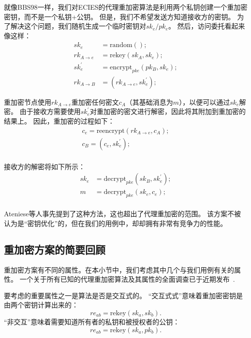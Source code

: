 \documentclass[longbibliography,nofootinbib]{revtex4-1}
\begin{document}
就像BBS98一样，我们对ECIES的代理重加密算法是利用两个私钥创建一个重加密密钥，而不是一个私钥+公钥。
但是，我们不希望发送方知道接收方的密钥。
为了解决这个问题，我们随机生成一个临时密钥对$sk_e/pk_e$。
然后，访问委托看起来像这样：
\begin{align}
    \label{eq:ephemeral-trick}
    sk_e &= \text{random}();\\
    rk_{A\rightarrow e} &= \text{rekey}(sk_A, sk_e);\\
    \label{eq:ephemeral-trick-end}
    sk_e^{\prime} &= \text{encrypt}_{pke}(pk_B, sk_e);\\
    rk_{A\rightarrow B} &= (rk_{A\rightarrow e}, sk_e^{\prime});
\end{align}

重加密节点使用$rk_{A\rightarrow e}$重加密任何密文$c_A$（其基础消息为$m$），以便可以通过$sk_e$解密。
由于接收方需要使用$sk_e^{\prime}$对重加密的密文进行解密，因此将其附加到重加密的结果上。
因此，重加密的过程如下：
\begin{align}
    c_e = \text{reencrypt}(rk_{A\rightarrow e}, c_{A});\\
    c_B = (c_e, sk_e^{\prime});\\
\end{align}

接收方的解密将如下所示：
\begin{align}
    sk_e &= \text{decrypt}_{pke}(sk_B, sk_e^{\prime});\\
    m &= \text{decrypt}_{pke}(sk_e, c_e);\\
\end{align}

Ateniese等人\cite{AFGH}事先提到了这种方法，这也超出了代理重加密的范围。
该方案不被认为是“密钥优化”的，但在我们的用例中，却却拥有非常有竞争力的性能。

\subsection{重加密方案的简要回顾}

重加密方案有不同的属性。在本小节中，我们考虑其中几个与我们用例有关的属性。 一个关于所有已知的代理重加密算法及其属性的全面调查已于近期发布~\cite{nunez2017proxy}.

要考虑的重要属性之一是算法是否是交互式的。 “交互式式”意味着重加密密钥是由两个密钥计算出来的：
\begin{equation}
    re_{ab} = \text{rekey}(sk_a, sk_b).
\end{equation}
“非交互”意味着需要知道所有者的私钥和被授权者的公钥：
\begin{equation}
    re_{ab} = \text{rekey}(sk_a, pk_b).
\end{equation}
\end{document}
